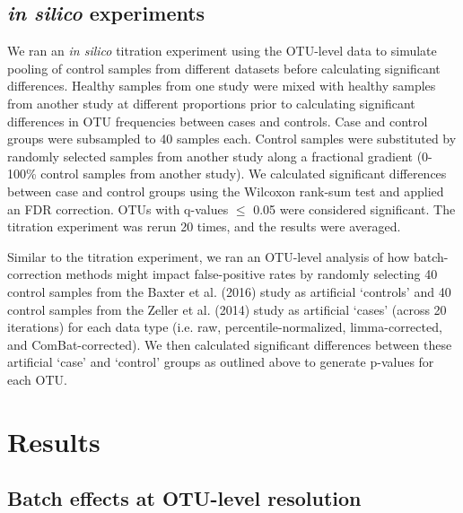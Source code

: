 \subsection{\textit{in silico} experiments}

We ran an \textit{in silico} titration experiment using the OTU-level data to simulate pooling of control samples from different datasets before calculating significant differences.
Healthy samples from one study were mixed with healthy samples from another study at different proportions prior to calculating significant differences in OTU frequencies between cases and controls.
Case and control groups were subsampled to 40 samples each. Control samples were substituted by randomly selected samples from another study along a fractional gradient (0-100\% control samples from another study).
We calculated significant differences between case and control groups using the Wilcoxon rank-sum test and applied an FDR correction.
OTUs with q-values $\leq$ 0.05 were considered significant.
The titration experiment was rerun 20 times, and the results were averaged.

Similar to the titration experiment, we ran an OTU-level analysis of how batch-correction methods might impact false-positive rates by randomly selecting 40 control samples from the Baxter et al. (2016) study as artificial `controls' and 40 control samples from the Zeller et al. (2014) study as artificial `cases' (across 20 iterations) for each data type (i.e. raw, percentile-normalized, limma-corrected, and ComBat-corrected).
We then calculated significant differences between these artificial `case' and `control' groups as outlined above to generate p-values for each OTU.

\section{Results}

\subsection{Batch effects at OTU-level resolution}

